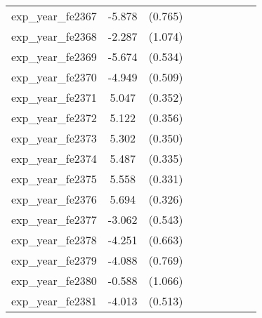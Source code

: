 {\begin{tabular}{l*{4}{cc}}
exp\_year\_fe2367&   -5.878\sym{***}&  (0.765)&                  &         &                  &         &                  &         \\
exp\_year\_fe2368&   -2.287\sym{*}  &  (1.074)&                  &         &                  &         &                  &         \\
exp\_year\_fe2369&   -5.674\sym{***}&  (0.534)&                  &         &                  &         &                  &         \\
exp\_year\_fe2370&   -4.949\sym{***}&  (0.509)&                  &         &                  &         &                  &         \\
exp\_year\_fe2371&    5.047\sym{***}&  (0.352)&                  &         &                  &         &                  &         \\
exp\_year\_fe2372&    5.122\sym{***}&  (0.356)&                  &         &                  &         &                  &         \\
exp\_year\_fe2373&    5.302\sym{***}&  (0.350)&                  &         &                  &         &                  &         \\
exp\_year\_fe2374&    5.487\sym{***}&  (0.335)&                  &         &                  &         &                  &         \\
exp\_year\_fe2375&    5.558\sym{***}&  (0.331)&                  &         &                  &         &                  &         \\
exp\_year\_fe2376&    5.694\sym{***}&  (0.326)&                  &         &                  &         &                  &         \\
exp\_year\_fe2377&   -3.062\sym{***}&  (0.543)&                  &         &                  &         &                  &         \\
exp\_year\_fe2378&   -4.251\sym{***}&  (0.663)&                  &         &                  &         &                  &         \\
exp\_year\_fe2379&   -4.088\sym{***}&  (0.769)&                  &         &                  &         &                  &         \\
exp\_year\_fe2380&   -0.588         &  (1.066)&                  &         &                  &         &                  &         \\
exp\_year\_fe2381&   -4.013\sym{***}&  (0.513)&                  &         &                  &         &                  &         \\

\end{tabular}}
